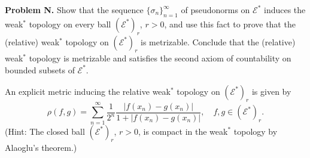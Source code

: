 \textbf{Problem N.} Show that the sequence $\{\sigma_n\}_{n=1}^{\infty}$ of pseudonorms on $\mathcal{E}^*$ induces the weak$^*$ topology on every ball $(\mathcal{E}^*)_r$, $r > 0$, and use this fact to prove that the (relative) weak$^*$ topology on $(\mathcal{E}^*)_r$ is metrizable. Conclude that the (relative) weak$^*$ topology is metrizable and satisfies the second axiom of countability on bounded subsets of $\mathcal{E}^*$.

An explicit metric inducing the relative weak$^*$ topology on $(\mathcal{E}^*)_r$ is given by
$$\rho(f, g) = \sum_{n=1}^{\infty} \frac{1}{2^n} \frac{|f(x_n) - g(x_n)|}{1 + |f(x_n) - g(x_n)|}, \quad f, g \in (\mathcal{E}^*)_r.$$
(Hint: The closed ball $(\mathcal{E}^*)_r$, $r > 0$, is compact in the weak$^*$ topology by Alaoglu's theorem.)
